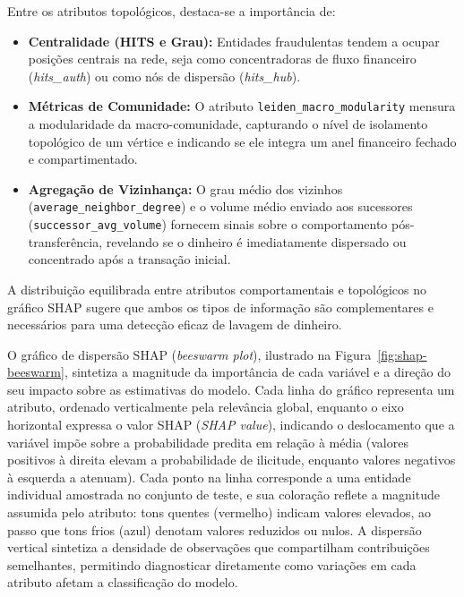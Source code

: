 \documentclass[titlepage,a4paper,oneside,onecolumn,12pt]{report}
\begin{document}
Entre os atributos topológicos, destaca-se a importância de:

\begin{itemize}
    \item \textbf{Centralidade (HITS e Grau):} Entidades fraudulentas tendem a ocupar posições centrais na rede, seja como concentradoras de fluxo financeiro (\textit{hits\_auth}) ou como nós de dispersão (\textit{hits\_hub}).
    
    \item \textbf{Métricas de Comunidade:} O atributo \texttt{leiden\_macro\_modularity} mensura a modularidade da macro-comunidade, capturando o nível de isolamento topológico de um vértice e indicando se ele integra um anel financeiro fechado e compartimentado.
    
    \item \textbf{Agregação de Vizinhança:} O grau médio dos vizinhos (\texttt{average\_neighbor\_degree}) e o volume médio enviado aos sucessores (\texttt{successor\_avg\_volume}) fornecem sinais sobre o comportamento pós-transferência, revelando se o dinheiro é imediatamente dispersado ou concentrado após a transação inicial.
\end{itemize}

A distribuição equilibrada entre atributos comportamentais e topológicos no gráfico SHAP sugere que ambos os tipos de informação são complementares e necessários para uma detecção eficaz de lavagem de dinheiro.

O gráfico de dispersão SHAP (\textit{beeswarm plot}), ilustrado na Figura~\ref{fig:shap-beeswarm}, sintetiza a magnitude da importância de cada variável e a direção do seu impacto sobre as estimativas do modelo. Cada linha do gráfico representa um atributo, ordenado verticalmente pela relevância global, enquanto o eixo horizontal expressa o valor SHAP (\textit{SHAP value}), indicando o deslocamento que a variável impõe sobre a probabilidade predita em relação à média (valores positivos à direita elevam a probabilidade de ilicitude, enquanto valores negativos à esquerda a atenuam). Cada ponto na linha corresponde a uma entidade individual amostrada no conjunto de teste, e sua coloração reflete a magnitude assumida pelo atributo: tons quentes (vermelho) indicam valores elevados, ao passo que tons frios (azul) denotam valores reduzidos ou nulos. A dispersão vertical sintetiza a densidade de observações que compartilham contribuições semelhantes, permitindo diagnosticar diretamente como variações em cada atributo afetam a classificação do modelo.
\end{document}
